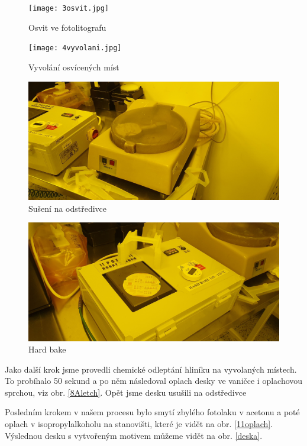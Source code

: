 \documentclass[a4paper,12pt]{article}
\begin{document}
\begin{figure}[h!]
	\centering
	\texttt{[image: 3osvit.jpg]}
	\caption{Osvit ve fotolitografu}
	\label{3osvit}
\end{figure}

\newpage
\begin{figure}[h!]
	\centering
	\texttt{[image: 4vyvolani.jpg]}
	\caption{Vyvolání osvícených míst}
	\label{4vyvolani}
\end{figure}

\begin{figure}[h!]
	\centering
	\includegraphics[width=130mm]{5odstredeni.jpg}
	\caption{Sušení na odstředivce}
	\label{5odstredeni}
\end{figure}

\begin{figure}[h!]
	\centering
	\includegraphics[width=130mm]{7hardbake.jpg}
	\caption{Hard bake}
	\label{7hardbake}
\end{figure}

\newpage
Jako další krok jsme provedli chemické odleptání hliníku na vyvolaných místech. To probíhalo 50 sekund a po něm následoval oplach desky ve vaničce i oplachovou sprchou, viz obr. \ref{8Aletch}. Opět jsme desku usušili na odstředivce

Posledním krokem v našem procesu bylo smytí zbylého fotolaku v acetonu a poté oplach v isopropylalkoholu na stanovišti, které je vidět na obr. \ref{11oplach}. Výslednou desku s vytvořeným motivem můžeme vidět na obr. \ref{deska}.
\end{document}
